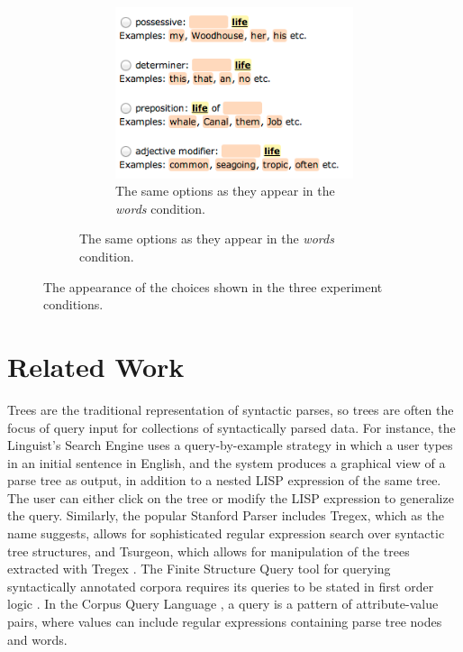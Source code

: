 \begin{figure}[th]
\begin{subfigure}{0.7\columnwidth}
	    \begin{subfigure}{0.7\columnwidth}
	    	\centering
	    	\includegraphics[width=0.9\columnwidth]{fig/words-choices}
	        \caption {The same options as they appear in the \emph{words} condition. \label{fig:words-choices}}
	    \end{subfigure}
	\end{subfigure}
\caption{\label{fig:choices} The appearance of the choices shown in the three experiment conditions.}
\end{figure}

\section{Related Work}

Trees are the traditional representation of syntactic parses, so trees are often the focus of query input for collections of syntactically parsed data.   For instance, the Linguist's Search Engine \cite{resnik2005web} uses a query-by-example strategy in which a user types in an initial sentence in English, and the system produces a graphical view of a parse tree as output, in addition to a nested LISP expression of the same tree.  The user can either click on the tree or modify the LISP expression to generalize the query.    Similarly, the popular Stanford Parser includes Tregex, which as the name suggests,  allows for sophisticated regular expression search over syntactic tree structures, and Tsurgeon, which allows for manipulation of the trees extracted with Tregex \cite{levy2006tregex}.
The Finite Structure Query tool for querying syntactically annotated corpora requires its queries to be stated in first order logic \cite{kepser2003finite}. In the Corpus Query Language \cite{jakubicek2010fast}, a query is a pattern of attribute-value pairs, where values can include regular expressions containing parse tree nodes and words.

